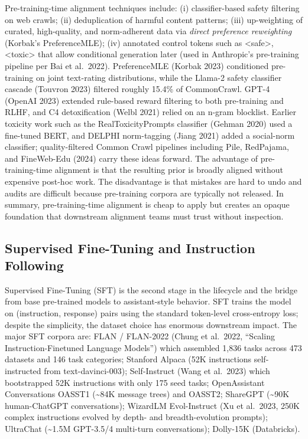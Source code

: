 Pre-training-time alignment techniques include: (i) classifier-based safety filtering on web crawls; (ii) deduplication of harmful content patterns; (iii) up-weighting of curated, high-quality, and norm-adherent data via \emph{direct preference reweighting} (Korbak's PreferenceMLE); (iv) annotated control tokens such as \textless\textbar safe\textbar\textgreater, \textless\textbar toxic\textbar\textgreater{} that allow conditional generation later (used in Anthropic's pre-training pipeline per Bai et al.~2022). PreferenceMLE (Korbak 2023) conditioned pre-training on joint text-rating distributions, while the Llama-2 safety classifier cascade (Touvron 2023) filtered roughly 15.4\% of CommonCrawl. GPT-4 (OpenAI 2023) extended rule-based reward filtering to both pre-training and RLHF, and C4 detoxification (Welbl 2021) relied on an n-gram blocklist. Earlier toxicity work such as the RealToxicityPrompts classifier (Gehman 2020) used a fine-tuned BERT, and DELPHI norm-tagging (Jiang 2021) added a social-norm classifier; quality-filtered Common Crawl pipelines including Pile, RedPajama, and FineWeb-Edu (2024) carry these ideas forward. The advantage of pre-training-time alignment is that the resulting prior is broadly aligned without expensive post-hoc work. The disadvantage is that mistakes are hard to undo and audits are difficult because pre-training corpora are typically not released. In summary, pre-training-time alignment is cheap to apply but creates an opaque foundation that downstream alignment teams must trust without inspection.

\subsection{Supervised Fine-Tuning and Instruction Following}\label{supervised-fine-tuning-and-instruction-following}

Supervised Fine-Tuning (SFT) is the second stage in the lifecycle and the bridge from base pre-trained models to assistant-style behavior. SFT trains the model on (instruction, response) pairs using the standard token-level cross-entropy loss; despite the simplicity, the dataset choice has enormous downstream impact. The major SFT corpora are: FLAN / FLAN-2022 (Chung et al.~2022, ``Scaling Instruction-Finetuned Language Models'') which assembled 1,836 tasks across 473 datasets and 146 task categories; Stanford Alpaca (52K instructions self-instructed from text-davinci-003); Self-Instruct (Wang et al.~2023) which bootstrapped 52K instructions with only 175 seed tasks; OpenAssistant Conversations OASST1 (\textasciitilde84K message trees) and OASST2; ShareGPT (\textasciitilde90K human-ChatGPT conversations); WizardLM Evol-Instruct (Xu et al.~2023, 250K complex instructions evolved by depth- and breadth-evolution prompts); UltraChat (\textasciitilde1.5M GPT-3.5/4 multi-turn conversations); Dolly-15K (Databricks).

